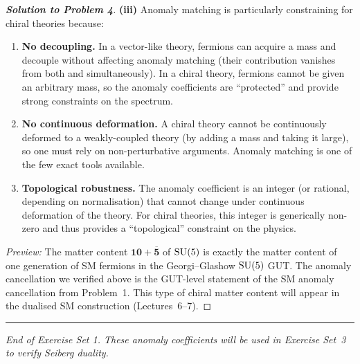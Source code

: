 \documentclass[11pt,a4paper]{article}
\begin{document}
\begin{proof}[\textbf{Solution to Problem 4}]
\textbf{(iii)} Anomaly matching is particularly constraining for chiral
theories because:
\begin{enumerate}[label=\arabic*.]
  \item \textbf{No decoupling.}  In a vector-like theory, fermions can
    acquire a mass and decouple without affecting anomaly matching (their
    contribution vanishes from both \UV{} and \IR{} simultaneously).
    In a chiral theory, fermions cannot be given an arbitrary mass, so
    the anomaly coefficients are ``protected'' and provide strong
    constraints on the \IR{} spectrum.
  \item \textbf{No continuous deformation.}  A chiral theory cannot be
    continuously deformed to a weakly-coupled theory (by adding a mass
    and taking it large), so one must rely on non-perturbative arguments.
    Anomaly matching is one of the few exact tools available.
  \item \textbf{Topological robustness.}  The anomaly coefficient is an
    integer (or rational, depending on normalisation) that cannot change
    under continuous deformation of the theory.  For chiral theories, this
    integer is generically non-zero and thus provides a ``topological''
    constraint on the \IR{} physics.
\end{enumerate}

\textit{Preview:}  The matter content $\mathbf{10} + \overline{\mathbf{5}}$
of $\mathrm{SU}(5)$ is exactly the matter content of one generation of SM fermions
in the Georgi--Glashow $\mathrm{SU}(5)$ GUT.  The anomaly cancellation we verified
above is the GUT-level statement of the SM anomaly cancellation from
Problem~1.  This type of chiral matter content will appear in the dualised
SM construction (Lectures~6--7).
\end{proof}

\bigskip

\begin{center}
\rule{0.6\textwidth}{0.4pt}

\textit{End of Exercise Set 1.  These anomaly coefficients will be used
in Exercise Set~3 to verify Seiberg duality.}
\end{center}
\end{document}
